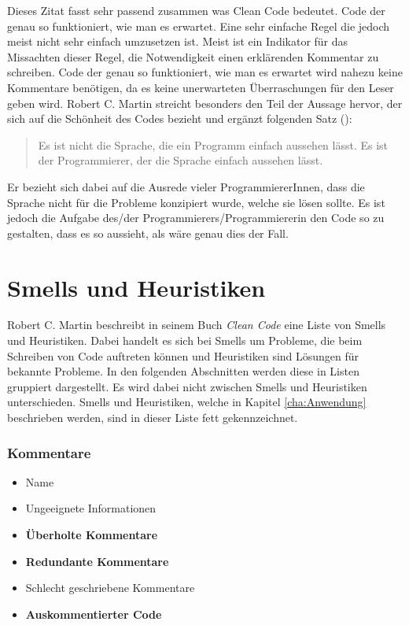 Dieses Zitat fasst sehr passend zusammen was Clean Code bedeutet. Code der genau so funktioniert, wie man es erwartet. Eine sehr einfache Regel die jedoch meist nicht sehr einfach umzusetzen ist. Meist ist ein Indikator für das Missachten dieser Regel, die Notwendigkeit einen erklärenden Kommentar zu schreiben. Code der genau so funktioniert, wie man es erwartet wird nahezu keine Kommentare benötigen, da es keine unerwarteten Überraschungen für den Leser geben wird. Robert C. Martin streicht besonders den Teil der Aussage hervor, der sich auf die Schönheit des Codes bezieht und ergänzt folgenden Satz  (\cite[Seite 40]{Martin2008}):

\begin{quotation}
Es ist nicht die Sprache, die ein Programm einfach aussehen lässt. Es ist der Programmierer, der die Sprache einfach aussehen lässt.
\end{quotation}

Er bezieht sich dabei auf die Ausrede vieler ProgrammiererInnen, dass die Sprache nicht für die Probleme konzipiert wurde, welche sie lösen sollte. Es ist jedoch die Aufgabe des/der Programmierers/Programmiererin den Code so zu gestalten, dass es so aussieht, als wäre genau dies der Fall.

\newpage
\section{Smells und Heuristiken}
Robert C. Martin beschreibt in seinem Buch \textit{Clean Code} eine Liste von Smells und Heuristiken. Dabei handelt es sich bei Smells um Probleme, die beim Schreiben von Code auftreten können und Heuristiken sind Lösungen für bekannte Probleme. In den folgenden Abschnitten werden diese in Listen gruppiert dargestellt. Es wird dabei nicht zwischen Smells und Heuristiken unterschieden. Smells und Heuristiken, welche in Kapitel \ref{cha:Anwendung} beschrieben werden, sind in dieser Liste fett gekennzeichnet.

\subsubsection{Kommentare}
\begin{itemize}
	\item Name
	\item Ungeeignete Informationen
	\item \textbf{Überholte Kommentare} 
	\item \textbf{Redundante Kommentare}
	\item Schlecht geschriebene Kommentare  
	\item \textbf{Auskommentierter Code}
\end{itemize}

